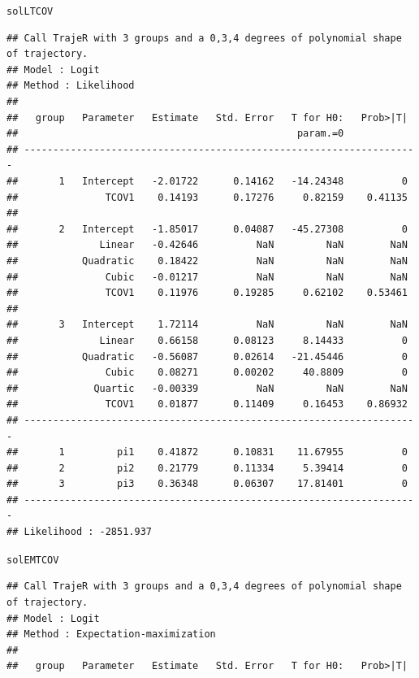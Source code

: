 \documentclass{article}\usepackage[]{graphicx}\usepackage[]{color}
\makeatletter
\newcommand{\hlstd}[1]{\textcolor[rgb]{0.345,0.345,0.345}{#1}}%
\newenvironment{kframe}{%
 \def\at@end@of@kframe{}%
 \ifinner\ifhmode%
  \def\at@end@of@kframe{\end{minipage}}%
  \begin{minipage}{\columnwidth}%
 \fi\fi%
 \def\FrameCommand##1{\hskip\@totalleftmargin \hskip-\fboxsep
 \colorbox{shadecolor}{##1}\hskip-\fboxsep
     \hskip-\linewidth \hskip-\@totalleftmargin \hskip\columnwidth}%
 \MakeFramed {\advance\hsize-\width
   \@totalleftmargin\z@ \linewidth\hsize
   \@setminipage}}%
 {\par\unskip\endMakeFramed%
 \at@end@of@kframe}
\newenvironment{knitrout}{}{} %
\makeatother
\begin{document}
\begin{knitrout}
\color{fgcolor}\begin{kframe}
\begin{alltt}
\hlstd{solLTCOV}
\end{alltt}
\begin{verbatim}
## Call TrajeR with 3 groups and a 0,3,4 degrees of polynomial shape of trajectory.
## Model : Logit
## Method : Likelihood 
##  
##   group   Parameter   Estimate   Std. Error   T for H0:   Prob>|T|  
##                                                param.=0             
## --------------------------------------------------------------------
##       1   Intercept   -2.01722      0.14162   -14.24348          0  
##               TCOV1    0.14193      0.17276     0.82159    0.41135  
##                                                                     
##       2   Intercept   -1.85017      0.04087   -45.27308          0  
##              Linear   -0.42646          NaN         NaN        NaN  
##           Quadratic    0.18422          NaN         NaN        NaN  
##               Cubic   -0.01217          NaN         NaN        NaN  
##               TCOV1    0.11976      0.19285     0.62102    0.53461  
##                                                                     
##       3   Intercept    1.72114          NaN         NaN        NaN  
##              Linear    0.66158      0.08123     8.14433          0  
##           Quadratic   -0.56087      0.02614   -21.45446          0  
##               Cubic    0.08271      0.00202     40.8809          0  
##             Quartic   -0.00339          NaN         NaN        NaN  
##               TCOV1    0.01877      0.11409     0.16453    0.86932  
## --------------------------------------------------------------------
##       1         pi1    0.41872      0.10831    11.67955          0  
##       2         pi2    0.21779      0.11334     5.39414          0  
##       3         pi3    0.36348      0.06307    17.81401          0  
## --------------------------------------------------------------------
## Likelihood : -2851.937
\end{verbatim}
\begin{alltt}
\hlstd{solEMTCOV}
\end{alltt}
\begin{verbatim}
## Call TrajeR with 3 groups and a 0,3,4 degrees of polynomial shape of trajectory.
## Model : Logit
## Method : Expectation-maximization 
##  
##   group   Parameter   Estimate   Std. Error   T for H0:   Prob>|T|  

\end{verbatim}
\end{kframe}
\end{knitrout}
\end{document}
